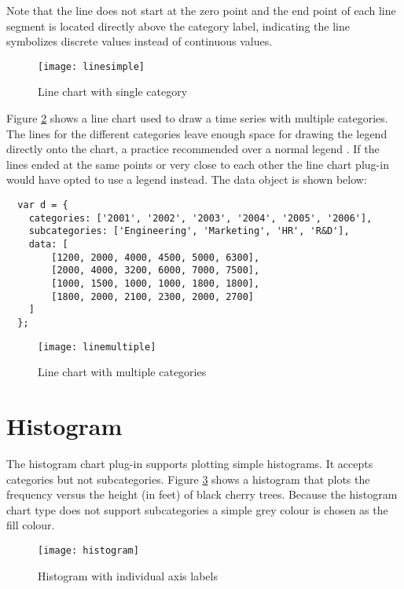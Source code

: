 Note that the line does not start at the zero point and the end point of each line segment is located directly above the category label, indicating the line symbolizes discrete values instead of continuous values.

\begin{figure}[H]
\centering
\texttt{[image: linesimple]}
\caption{Line chart with single category}
\label{simpleline}
\end{figure}

Figure \ref{multiline} shows a line chart used to draw a time series with multiple categories. The lines for the different categories leave enough space for drawing the legend directly onto the chart, a practice recommended over a normal legend \cite{few04}. If the lines ended at the same points or very close to each other the line chart plug-in would have opted to use a legend instead. The data object is shown below:

\begin{verbatim}
  var d = {
    categories: ['2001', '2002', '2003', '2004', '2005', '2006'],
    subcategories: ['Engineering', 'Marketing', 'HR', 'R&D'],
    data: [
        [1200, 2000, 4000, 4500, 5000, 6300],
        [2000, 4000, 3200, 6000, 7000, 7500],
        [1000, 1500, 1000, 1000, 1800, 1800],
        [1800, 2000, 2100, 2300, 2000, 2700]
    ]
  };
\end{verbatim}

\begin{figure}[H]
\centering
\texttt{[image: linemultiple]}
\caption{Line chart with multiple categories}
\label{multiline}
\end{figure}


\section{Histogram}

The histogram chart plug-in supports plotting simple histograms. It accepts categories but not subcategories. Figure \ref{histogram} shows a histogram that plots the frequency versus the height (in feet) of black cherry trees. Because the histogram chart type does not support subcategories a simple grey colour is chosen as the fill colour.

\begin{figure}[H]
\centering
\texttt{[image: histogram]}
\caption{Histogram with individual axis labels}
\label{histogram}
\end{figure}

